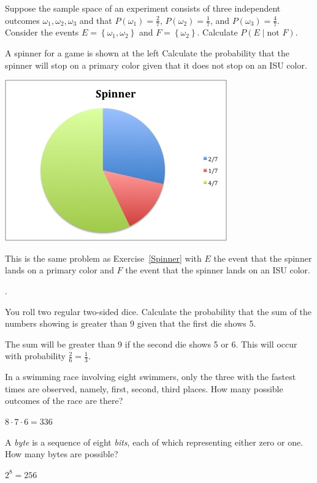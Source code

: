 \documentclass[answers,12pt]{exam}
\begin{document}
\begin{questions}
\question\label{Spinner} Suppose the sample space of an experiment
consists of three independent
outcomes $\omega_1,\omega_2,\omega_3$ and that
$P\left(\omega_1\right)=\frac{2}{7}$, $P\left(\omega_2\right)=\frac{1}{7}$,
and $P\left(\omega_3\right)=\frac{4}{7}$. Consider the events
$E=\left\{\omega_1,\omega_2\right\}$ and $F=\left\{\omega_2\right\}$.
Calculate $P\left(E\mid\text{not $F$}\right)$.
\begin{multicols}{2}
\question A spinner for a game is shown at the left
Calculate the probability that the spinner will stop
on a primary color given that it does not stop on an ISU color.
\begin{center}\includegraphics[scale=.6]{ReviewSpinner}\end{center}
\end{multicols}
\begin{solution} This is the same problem as Exercise~\ref{Spinner}
with $E$ the event that the spinner lands on a primary
color and $F$ the event that the spinner lands on an ISU color.
\end{solution}.

\question You roll two regular two-sided dice. Calculate the probability
that the sum of the numbers showing is greater than 9 given that
the first die shows 5.
\begin{solution} The sum will be greater than 9 if the second die
shows 5 or 6. This will occur with probability $\frac{2}{6}=\frac{1}{3}$.
\end{solution}

\question In a swimming race involving eight swimmers, only the three
with the fastest times are observed, namely, first, second, third places.
How many possible outcomes of the race are there?
\begin{solution} $8\cdot 7\cdot 6=336$ \end{solution}
\question A {\em byte} is a sequence of eight {\em bits}, each
of which representing either zero or one. How many bytes are possible?
\begin{solution} $2^8=256$\end{solution}


\end{questions}
\end{document}
